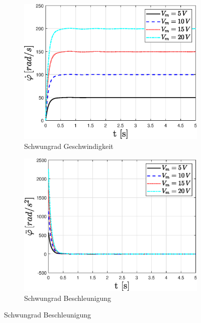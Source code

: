 \begin{figure}
    \captionsetup[subfigure]{justification=centering,font=footnotesize}
    \begin{subfigure}[b]{0.49\linewidth}
        \includegraphics[width=\linewidth]{Bilder/5_sensi/fig/Vm_sprung/phi_punkt.eps}
        \caption{Schwungrad Geschwindigkeit}
        \label{fig:Vm_sprung_phi_punkt}
    \end{subfigure}
    \begin{subfigure}[b]{0.49 \linewidth}
        \includegraphics[width=\linewidth]{Bilder/5_sensi/fig/Vm_sprung/phi_punkt_punkt.eps}
        \caption{Schwungrad Beschleunigung}
        \label{fig:Vm_sprung_phi_punkt_punkt}

\end{subfigure}
\end{figure}
